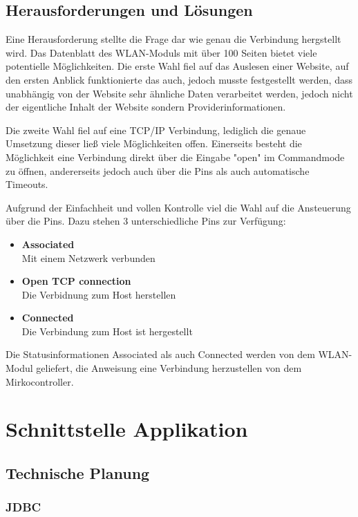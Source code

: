   \subsection{Herausforderungen und Lösungen}
  Eine Herausforderung stellte die Frage dar wie genau die Verbindung hergstellt wird. Das Datenblatt des WLAN-Moduls mit über 100 Seiten bietet viele potentielle Möglichkeiten.
  Die erste Wahl fiel auf das Auslesen einer Website, auf den ersten Anblick funktionierte das auch, jedoch musste festgestellt werden, dass unabhängig von der Website sehr ähnliche
  Daten verarbeitet werden, jedoch nicht der eigentliche Inhalt der Website sondern Providerinformationen.

  Die zweite Wahl fiel auf eine TCP/IP Verbindung, lediglich die genaue Umsetzung dieser ließ viele Möglichkeiten offen. Einerseits besteht die Möglichkeit eine Verbindung direkt
  über die Eingabe "open" im Commandmode zu öffnen, andererseits jedoch auch über die Pins als auch automatische Timeouts.

  Aufgrund der Einfachheit und vollen Kontrolle viel die Wahl auf die Ansteuerung über die Pins.
  Dazu stehen 3 unterschiedliche Pins zur Verfügung:
  \begin{itemize}
    \item \textbf{Associated}\\
    Mit einem Netzwerk verbunden
    \item \textbf{Open TCP connection}\\
    Die Verbidnung zum Host herstellen
    \item \textbf{Connected}\\
    Die Verbindung zum Host ist hergestellt
  \end{itemize}
  Die Statusinformationen Associated als auch Connected werden von dem WLAN-Modul geliefert, die Anweisung eine Verbindung herzustellen von dem Mirkocontroller.

\pagebreak
\section{Schnittstelle Applikation}

  \subsection{Technische Planung}

	   \subsubsection{JDBC}

